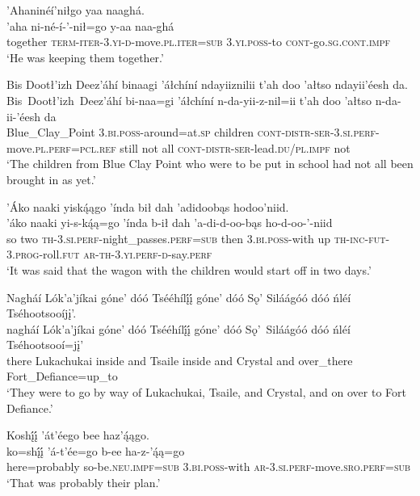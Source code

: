 \ea\label{ex:text1-20-6}
’Ahaninéí’niłgo yaa naaghá.\\
\gll ’aha ni-né-í-’-nił=go	y-aa	naa-ghá\\
     together \textsc{term}-\textsc{iter}-3.\textsc{yi}-\textsc{d}-move.\textsc{pl}.\textsc{iter}=\textsc{sub}	3.\textsc{yi}.\textsc{poss}-to	\textsc{cont}-go.\textsc{sg}.\textsc{cont}.\textsc{impf}\\
\glt `He was keeping them together.'
\z

\ea\label{ex:text1-20-7}
Bis Dootł’izh Deez’áhí binaagi ’áłchíní ndayiiznilii t’ah doo ’ałtso ndayii’éesh da.\\
\gll Bis~Dootł’izh~{Deez’áhí}	bi-naa=gi	’áłchíní	n-da-yii-z-nil=ii	t’ah	doo	’ałtso	n-da-ii-’éesh	da\\
     Blue\_Clay\_Point	3.\textsc{bi}.\textsc{poss}-around=at.\textsc{sp}	children	\textsc{cont}-\textsc{distr}-\textsc{ser}-3.\textsc{si}.\textsc{perf}-move.\textsc{pl}.\textsc{perf}=\textsc{pcl}.\textsc{ref}	still	not	all	\textsc{cont}-\textsc{distr}-\textsc{ser}-lead.\textsc{du}/\textsc{pl}.\textsc{impf}	not\\
\glt `The children from Blue Clay Point who were to be put in school had not all been brought in as yet.'
\z

\newpage
\ea\label{ex:text1-20-8}
’Áko naaki yiską́ągo ’índa bił dah ’adidoobąs hodoo’niid.\\
\gll ’áko	naaki	yi-s-ką́ą=go	’índa	b-ił	dah	’a-di-d-oo-bąs	ho-d-oo-’-niid\\
     so	two	\textsc{th}-3.\textsc{si}.\textsc{perf}-night\_passes.\textsc{perf}=\textsc{sub}	then	3.\textsc{bi}.\textsc{poss}-with	up	\textsc{th}-\textsc{inc}-\textsc{fut}-3.\textsc{prog}-roll.\textsc{fut}	\textsc{ar}-\textsc{th}-3.\textsc{yi}.\textsc{perf}-\textsc{d}-say.\textsc{perf}\\
\glt `It was said that the wagon with the children would start off in two days.'
\z

\ea\label{ex:text1-20-9}
Nagháí Lók’a’jíkai góne’ dóó Tsééhílį́į́ góne’ dóó Sǫ’ Siláágóó dóó ńléí Tséhootsooíjį’.\\
\gll nagháí	Lók’a’jíkai	góne’	dóó	Tsééhílį́į́	góne’	dóó	Sǫ’~{Siláágóó}	dóó	ńléí	Tséhootsooí=jį’\\
     there	Lukachukai	inside	and	Tsaile	inside	and	Crystal	and	over\_there	Fort\_Defiance=up\_to\\
\glt `They were to go by way of Lukachukai, Tsaile, and Crystal, and on over to Fort Defiance.'
\z

\ea\label{ex:text1-20-10}
Koshį́į́ ’át’éego bee haz’ą́ągo.\\
\gll ko=shį́į́	’á-t’ée=go	b-ee ha-z-’ą́ą=go\\
     here=probably	so-be.\textsc{neu}.\textsc{impf}=\textsc{sub}	3.\textsc{bi}.\textsc{poss}-with \textsc{ar}-3.\textsc{si}.\textsc{perf}-move.\textsc{sro}.\textsc{perf}=\textsc{sub}\\
\glt `That was probably their plan.'
\z


